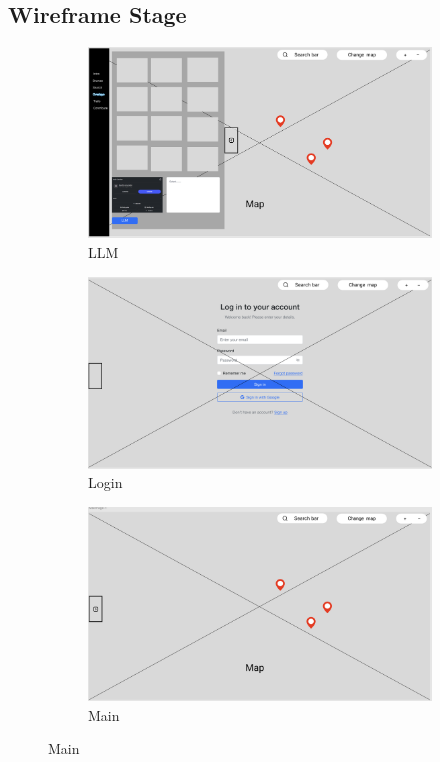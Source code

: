 \subsection{Wireframe Stage}
\begin{figure}[H]
  \centering
  \begin{subfigure}[b]{0.3\textwidth}
    \includegraphics[width=\textwidth]{screenshot/wireframe_llm.png}
    \caption{LLM}
  \end{subfigure}\hfill
  \begin{subfigure}[b]{0.3\textwidth}
    \includegraphics[width=\textwidth]{screenshot/wireframe_login.png}
    \caption{Login}
  \end{subfigure}\hfill
  \begin{subfigure}[b]{0.3\textwidth}
    \includegraphics[width=\textwidth]{screenshot/wireframe_main.png}
    \caption{Main}
  \end{subfigure}


\end{figure}
